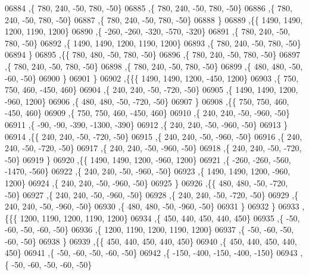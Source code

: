 \begin{DoxyCode}
06884     ,\{   780,   240,   -50,   780,   -50\}
06885     ,\{   780,   240,   -50,   780,   -50\}
06886     ,\{   780,   240,   -50,   780,   -50\}
06887     ,\{   780,   240,   -50,   780,   -50\}
06888     \}
06889    ,\{\{  1490,  1490,  1200,  1190,  1200\}
06890     ,\{  -260,  -260,  -320,  -570,  -320\}
06891     ,\{   780,   240,   -50,   780,   -50\}
06892     ,\{  1490,  1490,  1200,  1190,  1200\}
06893     ,\{   780,   240,   -50,   780,   -50\}
06894     \}
06895    ,\{\{   780,   480,   -50,   780,   -50\}
06896     ,\{   780,   240,   -50,   780,   -50\}
06897     ,\{   780,   240,   -50,   780,   -50\}
06898     ,\{   780,   240,   -50,   780,   -50\}
06899     ,\{   480,   480,   -50,   -60,   -50\}
06900     \}
06901    \}
06902   ,\{\{\{  1490,  1490,  1200,  -450,  1200\}
06903     ,\{   750,   750,   460,  -450,   460\}
06904     ,\{   240,   240,   -50,  -720,   -50\}
06905     ,\{  1490,  1490,  1200,  -960,  1200\}
06906     ,\{   480,   480,   -50,  -720,   -50\}
06907     \}
06908    ,\{\{   750,   750,   460,  -450,   460\}
06909     ,\{   750,   750,   460,  -450,   460\}
06910     ,\{   240,   240,   -50,  -960,   -50\}
06911     ,\{   -90,   -90,  -390, -1300,  -390\}
06912     ,\{   240,   240,   -50,  -960,   -50\}
06913     \}
06914    ,\{\{   240,   240,   -50,  -720,   -50\}
06915     ,\{   240,   240,   -50,  -960,   -50\}
06916     ,\{   240,   240,   -50,  -720,   -50\}
06917     ,\{   240,   240,   -50,  -960,   -50\}
06918     ,\{   240,   240,   -50,  -720,   -50\}
06919     \}
06920    ,\{\{  1490,  1490,  1200,  -960,  1200\}
06921     ,\{  -260,  -260,  -560, -1470,  -560\}
06922     ,\{   240,   240,   -50,  -960,   -50\}
06923     ,\{  1490,  1490,  1200,  -960,  1200\}
06924     ,\{   240,   240,   -50,  -960,   -50\}
06925     \}
06926    ,\{\{   480,   480,   -50,  -720,   -50\}
06927     ,\{   240,   240,   -50,  -960,   -50\}
06928     ,\{   240,   240,   -50,  -720,   -50\}
06929     ,\{   240,   240,   -50,  -960,   -50\}
06930     ,\{   480,   480,   -50,  -960,   -50\}
06931     \}
06932    \}
06933   ,\{\{\{  1200,  1190,  1200,  1190,  1200\}
06934     ,\{   450,   440,   450,   440,   450\}
06935     ,\{   -50,   -60,   -50,   -60,   -50\}
06936     ,\{  1200,  1190,  1200,  1190,  1200\}
06937     ,\{   -50,   -60,   -50,   -60,   -50\}
06938     \}
06939    ,\{\{   450,   440,   450,   440,   450\}
06940     ,\{   450,   440,   450,   440,   450\}
06941     ,\{   -50,   -60,   -50,   -60,   -50\}
06942     ,\{  -150,  -400,  -150,  -400,  -150\}
06943     ,\{   -50,   -60,   -50,   -60,   -50\}

\end{DoxyCode}
